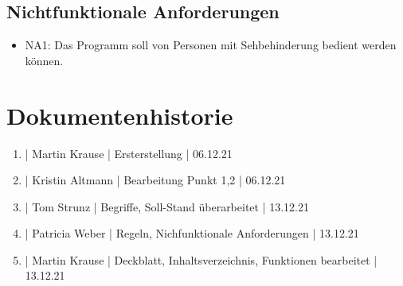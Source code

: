 \documentclass[12pt]{scrartcl}
\begin{document}
\subsection{Nichtfunktionale Anforderungen}

\begin{itemize}
	\item NA1: Das Programm soll von Personen mit Sehbehinderung bedient werden können.
\end{itemize}

\section{Dokumentenhistorie}

\begin{enumerate}
	\item | Martin Krause | Ersterstellung | 06.12.21
	\item | Kristin Altmann | Bearbeitung Punkt 1,2  | 06.12.21
	\item | Tom Strunz | Begriffe, Soll-Stand überarbeitet | 13.12.21
	\item | Patricia Weber | Regeln, Nichfunktionale Anforderungen | 13.12.21
	\item | Martin Krause | Deckblatt, Inhaltsverzeichnis, Funktionen bearbeitet | 13.12.21
\end{enumerate}
 
\end{document}
